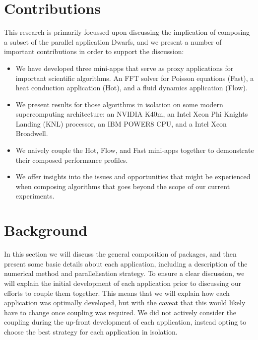 \documentclass[runningheads,a4paper]{llncs}
\begin{document}
\section{Contributions}

This research is primarily focussed upon discussing the implication of composing a subset of the parallel application Dwarfs, and we present a number of important contributions in order to support the discussion:

\begin{itemize}
  \item We have developed three mini-apps that serve as proxy applications for important scientific algorithms. An FFT solver for Poisson equations (Fast), a heat conduction application (Hot), and a fluid dynamics application (Flow).

  \item We present results for those algorithms in isolation on some modern supercomputing architecture: an NVIDIA K40m, an Intel Xeon Phi Knights Landing (KNL) processor, an IBM POWER8 CPU, and a Intel Xeon Broadwell.

  \item We naively couple the Hot, Flow, and Fast mini-apps together to demonstrate their composed performance profiles.

  \item We offer insights into the issues and opportunities that might be experienced when composing algorithms that goes beyond the scope of our current experiments.

\end{itemize}

\section{Background}

In this section we will discuss the general composition of packages, and then present some basic details about each application, including a description of the numerical method and parallelisation strategy. To ensure a clear discussion, we will explain the initial development of each application prior to discussing our efforts to couple them together. This means that we will explain how each application was optimally developed, but with the caveat that this would likely have to change once coupling was required. We did not actively consider the coupling during the up-front development of each application, instead opting to choose the best strategy for each application in isolation.
\end{document}
